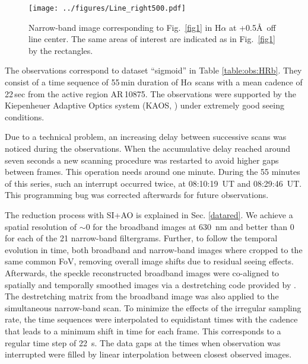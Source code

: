 \begin{figure}
\centering
\texttt{[image: ../figures/Line\_right500.pdf]} 
\caption{Narrow-band image corresponding to Fig.~\ref{fig1} in H$\alpha$ at +0.5\AA\ off line center. The same areas of interest are indicated as in Fig.~\ref{fig1} by the rectangles.}  
\label{fig2}
\end{figure}
 




The observations correspond to dataset ``sigmoid'' in Table \ref{table:obs:HRb}. They consist of a time sequence of 55\,min duration of H$\alpha$ scans with a mean cadence of 22\,sec from the  active region AR\,10875. The observations were supported by the Kiepenheuer Adaptive Optics system (KAOS, \citealt{2003SPIE.4853..187V}) under extremely good seeing conditions. 


Due to a technical problem, an increasing delay between successive scans was noticed during the observations. When the accumulative delay reached around seven  seconds  a new scanning procedure was restarted to avoid higher gaps between frames. This operation needs around one minute. During the 55 minutes of this series, such an interrupt occurred  twice, at  08:10:19~UT and 08:29:46~UT. This programming bug was corrected afterwards for future observations.



The reduction process with SI+AO  is explained in Sec. \ref{datared}. We achieve a spatial resolution of $\sim$0 for the broadband images at 630~nm and better than 0 for each of the 21 narrow-band filtergrams.  Further, to follow the temporal evolution in time, both broadband and narrow-band images where cropped to the same common FoV, removing overall image shifts due to residual seeing effects. Afterwards, the speckle reconstructed broadband images were co-aligned to spatially and temporally smoothed images via a destretching code provided by \citet{1992lest.rept....1Y}. The destretching matrix from the broadband image was also applied to the simultaneous narrow-band scan.  To minimize the effects of the irregular sampling rate, the time sequences were interpolated to equidistant times with the cadence that leads to a minimum shift in time for each frame. This corresponds to a regular time step of 22~s. The data gaps at the times when observation was interrupted were filled by linear interpolation between closest observed images.


